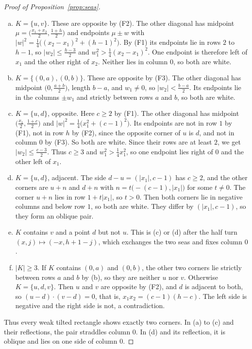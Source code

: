 \documentclass[12pt]{article}
\theoremstyle{plain}
\theoremstyle{definition}
\theoremstyle{remark}
\begin{document}
\begin{proof}[Proof of Proposition~\ref{prop:seas}]
\begin{enumerate}[(a)]
\item $K=\{u,v\}$. These are opposite by (F2). The other diagonal has midpoint
$\mu=\bigl(\frac{x_1+x_2}2,\frac{1+h}2\bigr)$ and endpoints $\mu\pm w$ with
$|w|^2=\frac14\bigl((x_2-x_1)^2+(h-1)^2\bigr)$. By (F1) its endpoints lie in rows $2$ to $h-1$,
so $|w_2|\le\frac{h-3}2$ and $w_1^2>\frac14(x_2-x_1)^2$. One endpoint is therefore left of $x_1$ and the other right of $x_2$.
Neither lies in column $0$, so both are white.
\item $K=\{(0,a),(0,b)\}$. These are opposite by (F3). The other diagonal has midpoint
$\bigl(0,\frac{a+b}2\bigr)$, length $b-a$, and $w_1\ne0$, so $|w_2|<\frac{b-a}2$. Its endpoints
lie in the columns $\pm w_1$ and strictly between rows $a$ and $b$, so both are white.
\item $K=\{u,d\}$, opposite. Here $c\ge2$ by (F1). The other diagonal has midpoint
$\bigl(\frac{x_1}2,\frac{1+c}2\bigr)$ and $|w|^2=\frac14\bigl(x_1^2+(c-1)^2\bigr)$. Its endpoints
are not in row $1$ by (F1), not in row $h$ by (F2), since the opposite corner of $u$ is $d$, and
not in column $0$ by (F3). So both are white. Since their rows are at least $2$, we get
$|w_2|\le\frac{c-3}2$. Thus $c\ge3$ and $w_1^2>\frac14x_1^2$, so one endpoint lies right of $0$ and the other left of $x_1$.
\item $K=\{u,d\}$, adjacent. The side $d-u=(|x_1|,c-1)$ has $c\ge2$, and the other corners are
$u+n$ and $d+n$ with $n=t\bigl(-(c-1),|x_1|\bigr)$ for some $t\ne0$. The corner $u+n$ lies in row
$1+t|x_1|$, so $t>0$. Then both corners lie in negative columns and below row $1$, so both are
white. They differ by $(|x_1|,c-1)$, so they form an oblique pair.
\item $K$ contains $v$ and a point $d$ but not $u$. This is (c) or (d) after the half turn
$(x,j)\mapsto(-x,h+1-j)$, which exchanges the two seas and fixes column $0$.
\item $|K|\ge3$. If $K$ contains $(0,a)$ and $(0,b)$, the other two corners lie strictly between
rows $a$ and $b$ by (b), so they are neither $u$ nor $v$. Otherwise $K=\{u,d,v\}$. Then $u$ and
$v$ are opposite by (F2), and $d$ is adjacent to both, so $(u-d)\cdot(v-d)=0$, that is,
$x_1x_2=(c-1)(h-c)$. The left side is negative and the right side is not, a contradiction.
\end{enumerate}
Thus every weak tilted rectangle shows exactly two corners.
In (a) to (c) and their reflections, the pair straddles column $0$.
In (d) and its reflection, it is oblique and lies on one side of column $0$.


\end{proof}
\end{document}

